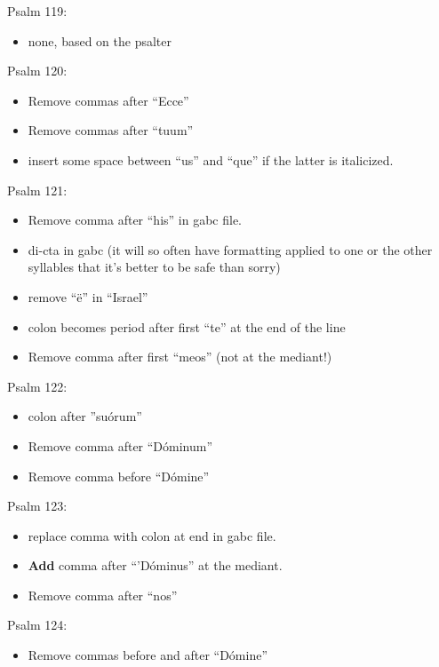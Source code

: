 \documentclass[11pt]{article}
\begin{document}
 Psalm 119:
  \begin{itemize}
  \item none, based on the psalter
    \end{itemize}

 Psalm 120:
  \begin{itemize}
  \item Remove commas after ``Ecce''
  \item  Remove commas after ``tuum''
  \item
  insert some space between ``us'' and ``que'' if the latter is italicized.
    \end{itemize}

   Psalm 121:
  \begin{itemize}
    \item Remove comma after ``his'' in gabc file.
        \item di-cta in gabc (it will so often have formatting applied to one or the other syllables that it's better to be safe than sorry)
        \item
        remove ``ë'' in ``Israel''
    \item colon becomes period after first ``te'' at the end of the line
    \item Remove comma after first ``meos'' (not at the mediant!)
      \end{itemize}
      
       Psalm 122:
  \begin{itemize}
  \item colon after ''suórum''
  \item  Remove comma after ``Dóminum''
    \item  Remove comma before ``Dómine''
    \end{itemize}

Psalm 123:
  \begin{itemize}
  \item
  replace comma with colon at end in gabc file.
  \item \textbf{Add} comma after ``'Dóminus'' at the mediant.
  \item  Remove comma after ``nos''
    \end{itemize}

Psalm 124:
  \begin{itemize}
  \item Remove commas before and after ``Dómine''
    \end{itemize}
      
\end{document}
